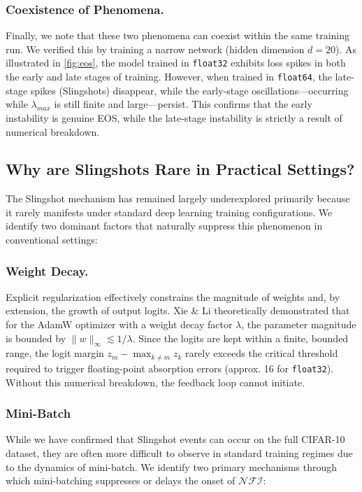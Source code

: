 \documentclass{article}
\theoremstyle{plain}
\theoremstyle{definition}
\theoremstyle{remark}
\begin{document}
\subsubsection{Coexistence of Phenomena.}
Finally, we note that these two phenomena can coexist within the same training run. 
We verified this by training a narrow network (hidden dimension $d=20$). As illustrated in \cref{fig:eos}, 
the model trained in \texttt{float32} exhibits loss spikes in both the early and late stages of training. 
However, when trained in \texttt{float64}, the late-stage spikes (Slingshots) disappear, 
while the early-stage oscillations—occurring while $\lambda_{max}$ is still finite and large—persist. 
This confirms that the early instability is genuine EOS, while the late-stage instability is strictly a result of numerical breakdown.


\subsection{Why are Slingshots Rare in Practical Settings?}
\label{app:slingshot_rarity}
The Slingshot mechanism has remained largely underexplored primarily because it rarely manifests under standard deep learning training configurations. We identify two dominant factors that naturally suppress this phenomenon in conventional settings:

\subsubsection{Weight Decay.} 
Explicit regularization effectively constrains the magnitude of weights and, by extension, the growth of output logits. 
Xie \& Li \cite{xie2024} theoretically demonstrated that for the AdamW optimizer with a weight decay factor $\lambda$, 
the parameter magnitude is bounded by $\|w\|_\infty \lesssim 1/\lambda$. Since the logits are kept within a finite, 
bounded range, the logit margin $z_m - \max_{k \neq m} z_k$ rarely exceeds the critical threshold required to trigger floating-point absorption errors (approx. 16 for \texttt{float32}). 
Without this numerical breakdown, the feedback loop cannot initiate.

\subsubsection{Mini-Batch}
\label{app:minibatch}

While we have confirmed that Slingshot events can occur on the full CIFAR-10 dataset, 
they are often more difficult to observe in standard training regimes due to the dynamics of mini-batch. We identify two primary mechanisms through which mini-batching suppresses or delays the onset of $\mathcal{NFI}$:
\end{document}
